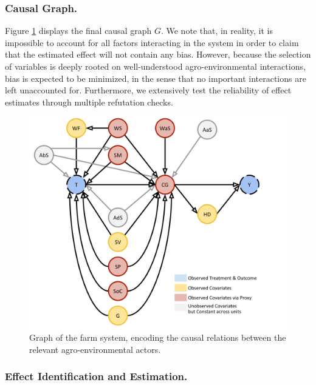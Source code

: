 \documentclass[letterpaper]{article} %
\begin{document}
\subsubsection{Causal Graph.}

Figure \ref{fig:causal-graph} displays the final causal graph $G$. We note that, in reality, it is impossible to account for all factors interacting in the system in order to claim that the estimated effect will not contain any bias. However, because the selection of variables is deeply rooted on well-understood agro-environmental interactions, bias is expected to be minimized, in the sense that no important interactions are left unaccounted for. Furthermore, we extensively test the reliability of effect estimates through multiple refutation checks.

\begin{figure}[!ht]
  \includegraphics[scale=0.166]{causal_graph_final.pdf}
  \caption{Graph of the farm system, encoding the causal relations between the relevant agro-environmental actors. \label{fig:causal-graph}}
\end{figure}

\subsubsection{Effect Identification and Estimation.}
\end{document}
